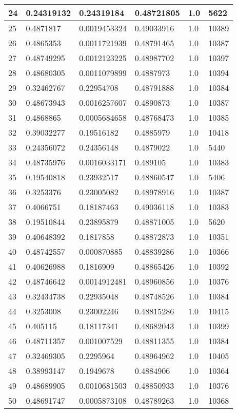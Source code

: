 \begin{longtable}{|l|l|l|l|l|l|}
24 & 0.24319132 & 0.24319184 & 0.48721805 & 1.0 & 5622 \\ \hline 
25 & 0.4871817 & 0.0019453324 & 0.49033916 & 1.0 & 10389 \\ \hline 
26 & 0.4865353 & 0.0011721939 & 0.48791465 & 1.0 & 10387 \\ \hline 
27 & 0.48749295 & 0.0012123225 & 0.48987702 & 1.0 & 10397 \\ \hline 
28 & 0.48680305 & 0.0011079899 & 0.4887973 & 1.0 & 10394 \\ \hline 
29 & 0.32462767 & 0.22954708 & 0.48791888 & 1.0 & 10384 \\ \hline 
30 & 0.48673943 & 0.0016257607 & 0.4890873 & 1.0 & 10387 \\ \hline 
31 & 0.4868865 & 0.0005684658 & 0.48768473 & 1.0 & 10385 \\ \hline 
32 & 0.39032277 & 0.19516182 & 0.4885979 & 1.0 & 10418 \\ \hline 
33 & 0.24356072 & 0.24356148 & 0.4879022 & 1.0 & 5440 \\ \hline 
34 & 0.48735976 & 0.0016033171 & 0.489105 & 1.0 & 10383 \\ \hline 
35 & 0.19540818 & 0.23932517 & 0.48860547 & 1.0 & 5406 \\ \hline 
36 & 0.3253376 & 0.23005082 & 0.48978916 & 1.0 & 10387 \\ \hline 
37 & 0.4066751 & 0.18187463 & 0.49036118 & 1.0 & 10383 \\ \hline 
38 & 0.19510844 & 0.23895879 & 0.48871005 & 1.0 & 5620 \\ \hline 
39 & 0.40648392 & 0.1817858 & 0.48872873 & 1.0 & 10351 \\ \hline 
40 & 0.48742557 & 0.000870885 & 0.48839286 & 1.0 & 10366 \\ \hline 
41 & 0.40626988 & 0.1816909 & 0.48865426 & 1.0 & 10392 \\ \hline 
42 & 0.48746642 & 0.0014912481 & 0.48960856 & 1.0 & 10376 \\ \hline 
43 & 0.32434738 & 0.22935048 & 0.48748526 & 1.0 & 10384 \\ \hline 
44 & 0.3253008 & 0.23002246 & 0.48815286 & 1.0 & 10415 \\ \hline 
45 & 0.405115 & 0.18117341 & 0.48682043 & 1.0 & 10399 \\ \hline 
46 & 0.48711357 & 0.001007529 & 0.48811355 & 1.0 & 10384 \\ \hline 
47 & 0.32469305 & 0.2295964 & 0.48964962 & 1.0 & 10405 \\ \hline 
48 & 0.38993147 & 0.1949678 & 0.4884906 & 1.0 & 10364 \\ \hline 
49 & 0.48689905 & 0.0010681503 & 0.48850933 & 1.0 & 10376 \\ \hline 
50 & 0.48691747 & 0.0005873108 & 0.48789263 & 1.0 & 10368 \\ \hline 
\end{longtable}